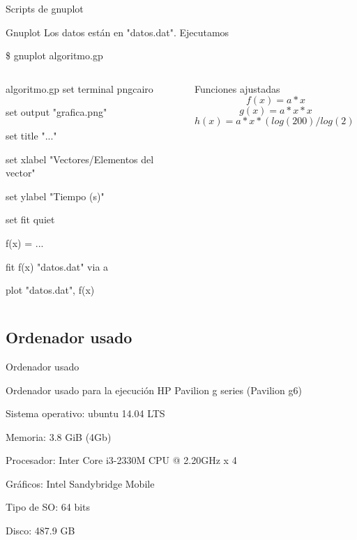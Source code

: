 
\begin{frame}{Scripts de gnuplot}
	\begin{block}{Gnuplot}		
		Los datos están en "datos.dat". Ejecutamos	
			
		\hspace{1cm}\$ gnuplot algoritmo.gp
	\end{block}
	\pause
	
	\begin{columns}

	\begin{column}{5cm}
	\begin{exampleblock}{algoritmo.gp}
	set terminal pngcairo
	
	set output "grafica.png"

	set title "..."

	set xlabel "Vectores/Elementos del vector"

	set ylabel "Tiempo (s)"

	set fit quiet

	f(x) = ...

	fit f(x) "datos.dat" via a

	plot "datos.dat", f(x)
	\end{exampleblock}
	\end{column}
	\pause
	
	\begin{column}{5cm}
	\begin{block}{Funciones ajustadas}
		\[f(x) = a*x\]
		\[g(x) = a*x*x\]
		\[h(x) = a*x*(log(200)/log(2))\]
	\end{block}
	\end{column}
	
	\end{columns}
\end{frame}

\subsection{Ordenador usado}
\begin{frame}{Ordenador usado}
	\begin{alertblock}{Ordenador usado para la ejecuci\'on}
	HP Pavilion g series (Pavilion g6)

	Sistema operativo: ubuntu 14.04 LTS

	Memoria: 3.8 GiB (4Gb)

	Procesador: Inter Core i3-2330M CPU @ 2.20GHz x 4

	Gráficos: Intel Sandybridge Mobile

	Tipo de SO: 64 bits

	Disco: 487.9 GB	
	\end{alertblock}
\end{frame}


